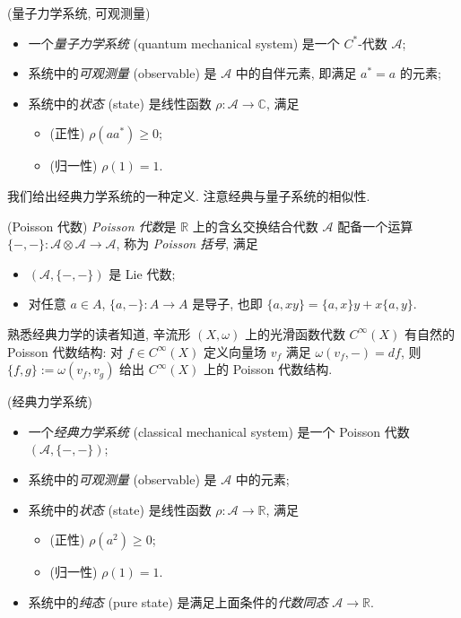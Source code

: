 \begin{definition}
	{(量子力学系统, 可观测量)}
	\begin{itemize}
		\item 一个\emph{量子力学系统} (quantum mechanical system) 是一个 $C^*$-代数 $\mathcal A$;
		\item 系统中的\emph{可观测量} (observable) 是 $\mathcal A$ 中的自伴元素, 即满足 $a^*=a$ 的元素;
		\item 系统中的\emph{状态} (state) 是线性函数 $\rho\colon \mathcal A\to \mathbb{C}$, 满足
		\begin{itemize}
			\item (正性) $\rho(aa^*)\geq 0$;
			\item (归一性) $\rho(1)=1$.
		\end{itemize}
	\end{itemize}
\end{definition}

我们给出经典力学系统的一种定义. 注意经典与量子系统的相似性.

\begin{definition}
	{(Poisson 代数)}
	\emph{Poisson 代数}是 $\mathbb{R}$ 上的含幺交换结合代数 $\mathcal A$ 配备一个运算 $\{-,-\}\colon \mathcal A\otimes \mathcal A\to \mathcal A$, 称为 \emph{Poisson 括号}, 满足
	\begin{itemize}
		\item $(\mathcal A,\{-,-\})$ 是 Lie 代数;
		\item 对任意 $a\in A$, $\{a,-\}\colon A\to A$ 是导子, 也即 $\{a,xy\}=\{a,x\}y+x\{a,y\}$.
	\end{itemize}
\end{definition}

\begin{example}
	{}
	熟悉经典力学的读者知道, 辛流形 $(X,\omega)$ 上的光滑函数代数 $C^\infty (X)$ 有自然的 Poisson 代数结构: 对 $f\in C^\infty (X)$ 定义向量场 $v_f$ 满足 $\omega(v_f,-) = df$, 则 $\{f,g\}:=\omega(v_f,v_g)$ 给出 $C^\infty (X)$ 上的 Poisson 代数结构.
\end{example}

\begin{definition}
	[label={classical-mechanical-system}]
	{(经典力学系统)}
	\begin{itemize}
		\item 一个\emph{经典力学系统} (classical mechanical system) 是一个 Poisson 代数 $(\mathcal A,\{-,-\})$;
		\item 系统中的\emph{可观测量} (observable) 是 $\mathcal A$ 中的元素;
		\item 系统中的\emph{状态} (state) 是线性函数 $\rho\colon \mathcal A\to \mathbb{R}$, 满足
		\begin{itemize}
			\item (正性) $\rho(a^2)\geq 0$;
			\item (归一性) $\rho(1)=1$.
		\end{itemize}
		\item 系统中的\emph{纯态} (pure state) 是满足上面条件的\emph{代数同态} $\mathcal A\to\mathbb{R}$.
	\end{itemize}
\end{definition}

